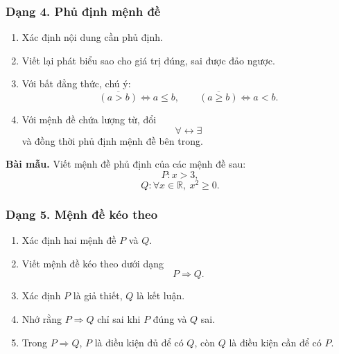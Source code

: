 \subsubsection{Dạng 4. Phủ định mệnh đề}

\begin{phuongphap}
\begin{enumerate}
	\item Xác định nội dung cần phủ định.
	\item Viết lại phát biểu sao cho giá trị đúng, sai được đảo ngược.
	\item Với bất đẳng thức, chú ý:
	\[
	\overline{(a>b)}\Leftrightarrow a\le b,
	\qquad
	\overline{(a\ge b)}\Leftrightarrow a<b.
	\]
	\item Với mệnh đề chứa lượng từ, đổi
	\[
	\forall\longleftrightarrow\exists
	\]
	và đồng thời phủ định mệnh đề bên trong.
\end{enumerate}
\end{phuongphap}

\begin{vidumau}

\textbf{Bài mẫu.} Viết mệnh đề phủ định của các mệnh đề sau:
\[
P\colon x>3,
\]
\[
Q\colon \forall x\in\mathbb{R},\ x^2\ge0.
\]
\end{vidumau}


\subsubsection{Dạng 5. Mệnh đề kéo theo}

\begin{phuongphap}
\begin{enumerate}
	\item Xác định hai mệnh đề $P$ và $Q$.
	\item Viết mệnh đề kéo theo dưới dạng
	\[
	P\Rightarrow Q.
	\]
	\item Xác định $P$ là giả thiết, $Q$ là kết luận.
	\item Nhớ rằng $P\Rightarrow Q$ chỉ sai khi $P$ đúng và $Q$ sai.
	\item Trong $P\Rightarrow Q$, $P$ là điều kiện đủ để có $Q$, còn $Q$ là điều kiện cần để có $P$.
\end{enumerate}
\end{phuongphap}

